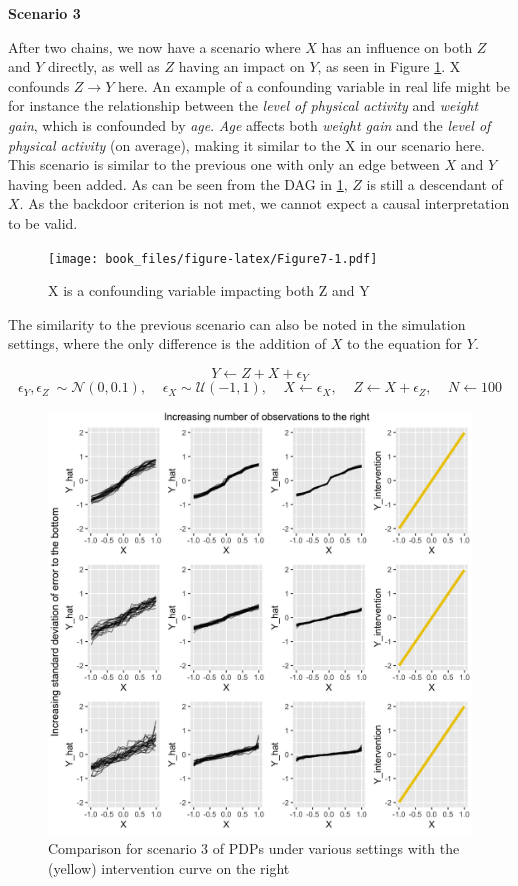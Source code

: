 \documentclass[]{krantz}
\begin{document}
\textbf{Scenario 3}

After two chains, we now have a scenario where \(X\) has an influence on
both \(Z\) and \(Y\) directly, as well as \(Z\) having an impact on
\(Y\), as seen in Figure \ref{fig:Figure7}. X confounds
\(Z \rightarrow Y\) here. An example of a confounding variable in real
life might be for instance the relationship between the \emph{level of
physical activity} and \emph{weight gain}, which is confounded by
\emph{age}. \emph{Age} affects both \emph{weight gain} and the
\emph{level of physical activity} (on average), making it similar to the
X in our scenario here. This scenario is similar to the previous one
with only an edge between \(X\) and \(Y\) having been added. As can be
seen from the DAG in \ref{fig:Figure7}, \(Z\) is still a descendant of
\(X\). As the backdoor criterion is not met, we cannot expect a causal
interpretation to be valid.

\begin{figure}
\centering
\texttt{[image: book\_files/figure-latex/Figure7-1.pdf]}
\caption{\label{fig:Figure7}X is a confounding variable impacting both Z and
Y}
\end{figure}

The similarity to the previous scenario can also be noted in the
simulation settings, where the only difference is the addition of \(X\)
to the equation for \(Y\).

\[ Y \leftarrow Z + X + \epsilon_Y  \]
\[ \epsilon_Y,\epsilon_Z ~ \sim \mathcal{N}(0, 0.1), \ \ \ \ \ \epsilon_X \sim \mathcal{U}(-1,1), \ \ \ \ \ X \leftarrow \epsilon_X, \ \ \ \ \ Z \leftarrow X + \epsilon_Z, \ \ \ \ \ N \leftarrow 100 \]

\begin{figure}

\includegraphics[width=1\linewidth]{images/scenario3_all} \hfill{}

\caption{Comparison for scenario 3 of PDPs under various settings with the (yellow) intervention curve on the right}\label{fig:Figure8}
\end{figure}
\end{document}
